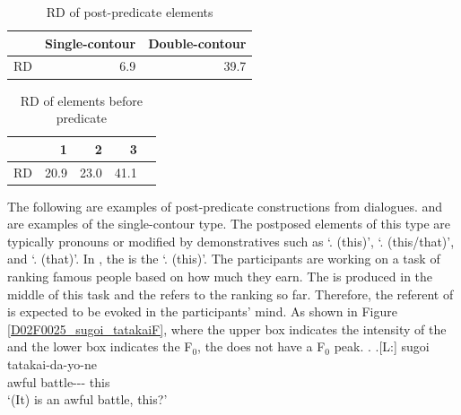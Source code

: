 \begin{table}
 \centering
 \caption{RD of post-predicate elements}
 \begin{tabular}{lrr}
 \toprule
   & Single-contour & Double-contour \\
 \midrule
  RD & 6.9 & 39.7 \\
 \bottomrule
 \end{tabular}
 \label{RDPostT}
\end{table}
\begin{table}
  \centering
 \caption{RD of elements before predicate}
 \begin{tabular}{lrrrr}
 \toprule
  &  1  & 2 & 3 \\
 \midrule
 RD & 20.9 & 23.0 & 41.1 \\
 \bottomrule
 \end{tabular}
 \label{RDPreT}
\end{table}

The following are examples of post-predicate constructions from dialogues.
\Next and \NNext are examples of the single-contour type.
The postposed elements of this type are typically pronouns or modified by demonstratives such as  `. (this)',  `. (this/that)', and  `. (that)'.
In \Next,
the  is the   `. (this)'.
The participants are working on a task of ranking famous people based on how much they earn.
The  is produced in the middle of this task and
the   refers to the ranking so far.
Therefore, the referent of  is expected to be evoked in the participants' mind.
As shown in Figure \ref{D02F0025_sugoi_tatakaiF},
where the upper box indicates the intensity of the 
and the lower box indicates the F$_{0}$,
the   does not have a F$_{0}$ peak.
%
\ex. \label{D02F0025_sugoi_tatakai}
	\ag.[L:] sugoi tatakai-da-yo-ne  \\
	awful battle--- this \\
	`(It) is an awful battle, this?'

